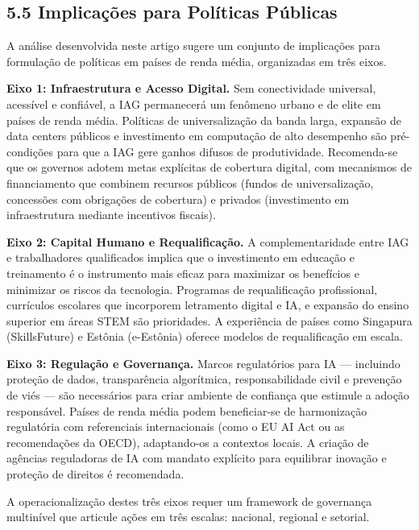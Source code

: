 \documentclass[
  brazilian,
  12pt,
]{article}
\begin{document}
\subsection{5.5 Implicações para Políticas Públicas}\label{implicauxe7uxf5es-para-poluxedticas-puxfablicas}

A análise desenvolvida neste artigo sugere um conjunto de implicações para formulação de políticas em países de renda média, organizadas em três eixos.

\textbf{Eixo 1: Infraestrutura e Acesso Digital.} Sem conectividade universal, acessível e confiável, a IAG permanecerá um fenômeno urbano e de elite em países de renda média. Políticas de universalização da banda larga, expansão de data centers públicos e investimento em computação de alto desempenho são pré-condições para que a IAG gere ganhos difusos de produtividade. Recomenda-se que os governos adotem metas explícitas de cobertura digital, com mecanismos de financiamento que combinem recursos públicos (fundos de universalização, concessões com obrigações de cobertura) e privados (investimento em infraestrutura mediante incentivos fiscais).

\textbf{Eixo 2: Capital Humano e Requalificação.} A complementaridade entre IAG e trabalhadores qualificados implica que o investimento em educação e treinamento é o instrumento mais eficaz para maximizar os benefícios e minimizar os riscos da tecnologia. Programas de requalificação profissional, currículos escolares que incorporem letramento digital e IA, e expansão do ensino superior em áreas STEM são prioridades. A experiência de países como Singapura (SkillsFuture) e Estônia (e-Estônia) oferece modelos de requalificação em escala.

\textbf{Eixo 3: Regulação e Governança.} Marcos regulatórios para IA --- incluindo proteção de dados, transparência algorítmica, responsabilidade civil e prevenção de viés --- são necessários para criar ambiente de confiança que estimule a adoção responsável. Países de renda média podem beneficiar-se de harmonização regulatória com referenciais internacionais (como o EU AI Act ou as recomendações da OECD), adaptando-os a contextos locais. A criação de agências reguladoras de IA com mandato explícito para equilibrar inovação e proteção de direitos é recomendada.

A operacionalização destes três eixos requer um framework de governança multinível que articule ações em três escalas: nacional, regional e setorial.
\end{document}
